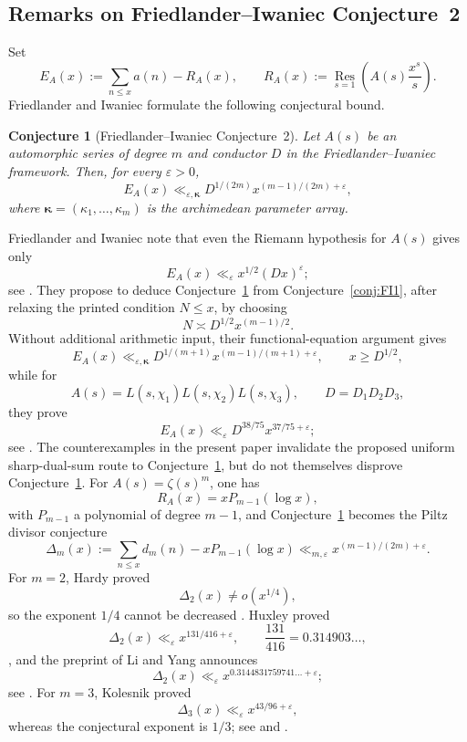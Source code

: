 \documentclass[11pt]{amsart}
\theoremstyle{plain}
\newtheorem{conjecture}[theorem]{Conjecture}
\theoremstyle{definition}
\theoremstyle{remark}
\newcommand{\Res}{\operatorname*{Res}}
\numberwithin{equation}{section}
\begin{document}
\subsection{Remarks on Friedlander--Iwaniec Conjecture~2}
\label{subsec:importance-C2}

Set
\[
  E_A(x)
  :=
  \sum_{n\le x}a(n)-R_A(x),
  \qquad
  R_A(x)
  :=
  \Res_{s=1}\left(A(s)\frac{x^s}{s}\right).
\]
Friedlander and Iwaniec formulate the following conjectural bound.


\begin{conjecture}[Friedlander--Iwaniec Conjecture~2]
\label{conj:FI2}
Let $A(s)$ be an automorphic series of degree $m$ and conductor $D$
in the Friedlander--Iwaniec framework. Then, for every
$\varepsilon>0$,
\[
  E_A(x)
  \ll_{\varepsilon,\boldsymbol\kappa}
  D^{1/(2m)}x^{(m-1)/(2m)+\varepsilon},
\]
where $\boldsymbol\kappa=(\kappa_1,\ldots,\kappa_m)$ is the
archimedean parameter array.
\end{conjecture}

Friedlander and Iwaniec note that even the Riemann hypothesis for
$A(s)$ gives only
\[
  E_A(x)\ll_\varepsilon x^{1/2}(Dx)^\varepsilon;
\]
see \cite[p.~500]{FriedlanderIwaniec}. They propose to deduce
Conjecture~\ref{conj:FI2} from Conjecture~\ref{conj:FI1}, after
relaxing the printed condition $N\le x$, by choosing
\[
  N\asymp D^{1/2}x^{(m-1)/2}.
\]
Without additional arithmetic input, their functional-equation
argument gives
\[
  E_A(x)
  \ll_{\varepsilon,\boldsymbol\kappa}
  D^{1/(m+1)}x^{(m-1)/(m+1)+\varepsilon},
  \qquad x\ge D^{1/2},
\]
while for
\[
  A(s)=L(s,\chi_1)L(s,\chi_2)L(s,\chi_3),
  \qquad D=D_1D_2D_3,
\]
they prove
\[
  E_A(x)\ll_\varepsilon D^{38/75}x^{37/75+\varepsilon};
\]
see \cite[Proposition~1.1 and Theorem~4.2]{FriedlanderIwaniec}.
The counterexamples in the present paper invalidate the proposed
uniform sharp-dual-sum route to Conjecture~\ref{conj:FI2}, but do not
themselves disprove Conjecture~\ref{conj:FI2}. For $A(s)=\zeta(s)^m$, one has
\[
  R_A(x)=xP_{m-1}(\log x),
\]
with $P_{m-1}$ a polynomial of degree $m-1$, and
Conjecture~\ref{conj:FI2} becomes the Piltz divisor conjecture
\[
  \Delta_m(x)
  :=
  \sum_{n\le x}d_m(n)-xP_{m-1}(\log x)
  \ll_{m,\varepsilon}
  x^{(m-1)/(2m)+\varepsilon}.
\]
For $m=2$, Hardy proved
\[
  \Delta_2(x)\ne o(x^{1/4}),
\]
so the exponent $1/4$ cannot be decreased \cite{Hardy}. Huxley proved
\[
  \Delta_2(x)\ll_\varepsilon x^{131/416+\varepsilon},
  \qquad
  \frac{131}{416}=0.314903\ldots,
\]
\cite{Huxley}, and the preprint of Li and Yang announces
\[
  \Delta_2(x)
  \ll_\varepsilon
  x^{0.3144831759741\ldots+\varepsilon};
\]
see \cite[Theorem~1.2]{LiYang}. For $m=3$, Kolesnik proved
\[
  \Delta_3(x)\ll_\varepsilon x^{43/96+\varepsilon},
\]
whereas the conjectural exponent is $1/3$; see \cite{Kolesnik} and
\cite[p.~504]{FriedlanderIwaniec}.
\end{document}
